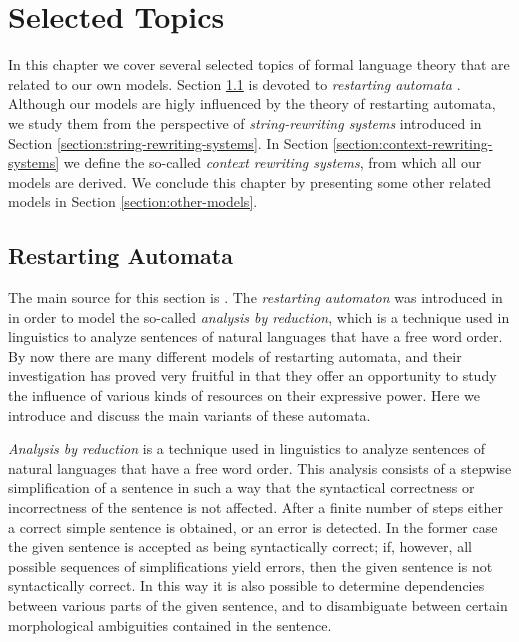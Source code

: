 \chapter{Selected Topics}
\label{chapter:advanced}

In this chapter we cover several selected topics of formal language theory that are related to our own models. Section \ref{section:restarting-automata} is devoted to \emph{restarting automata} \cite{O06}. Although our models are higly influenced by the theory of restarting automata, we study them from the perspective of \emph{string-rewriting systems} \cite{bookOtto93} introduced in Section \ref{section:string-rewriting-systems}. In Section \ref{section:context-rewriting-systems} we define the so-called \emph{context rewriting systems}, from which all our models are derived. We conclude this chapter by presenting some other related models in Section \ref{section:other-models}.

\section{Restarting Automata}
\label{section:restarting-automata}

The main source for this section is \cite{O06}. The \emph{restarting automaton} was introduced in \cite{JMPV95} in order to model the so-called \emph{analysis by reduction}, which is a technique used in linguistics to analyze sentences of natural languages that have a free word order. By now there are many different models of restarting automata, and their investigation has proved very fruitful in that they offer an opportunity to study the influence of various kinds of resources on their expressive power. Here we introduce and discuss the main variants of these automata.

\emph{Analysis by reduction} is a technique used in linguistics to analyze sentences of natural languages that have a free word order. This analysis consists of a stepwise simplification of a sentence in such a way that the syntactical correctness or incorrectness of the sentence is not affected. After a finite number of steps either a correct simple sentence is obtained, or an error is detected. In the former case the given sentence is accepted as being syntactically correct; if, however, all possible sequences of simplifications yield errors, then the given sentence is not syntactically correct. In this way it is also possible to determine dependencies between various parts of the given sentence, and to disambiguate between certain morphological ambiguities contained in the sentence.

